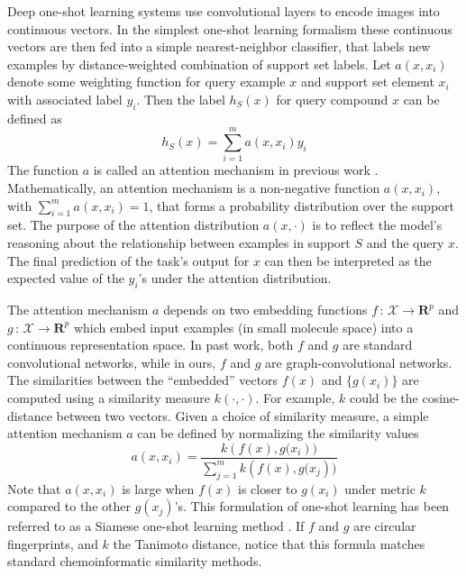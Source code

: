 \documentclass[journal=jacsat,manuscript=article]{achemso}
\begin{document}
Deep one-shot learning systems \cite{santoro2016one, vinyals2016matching} use convolutional layers to encode images into continuous vectors. In the simplest one-shot learning formalism these continuous vectors are then fed into a simple nearest-neighbor classifier, that labels new examples by distance-weighted combination of support set labels. Let $a(x, x_i)$ denote some weighting function for query example $x$ and support set element $x_i$ with associated label $y_i$. Then the label $h_S(x)$ for query compound $x$ can be defined as
\[
h_S(x) = \sum\limits_{i=1}^{m}a\left(x,x_i\right)y_i
\]
The function $a$ is called an attention mechanism in previous work \cite{vinyals2016matching}. Mathematically, an attention mechanism is a non-negative function $a(x,x_i)$, with $\sum\nolimits_{i=1}^{m}a(x,x_i)=1$, that forms a probability distribution over the support set. The purpose of the attention distribution $a(x, \cdot)$ is to reflect the model's reasoning about the relationship between examples in support $S$ and the query $x$. The final prediction of the task's output for $x$ can then be interpreted as the expected value of the $y_i$'s under the attention distribution.

The attention mechanism $a$ depends on two embedding functions $f\,:\,\mathcal{X}\rightarrow\mathbf{R}^p$ and $g\,:\,\mathcal{X}\rightarrow\mathbf{R}^p$ which embed input examples (in small molecule space) into a continuous representation space. In past work, both $f$ and $g$ are standard convolutional networks, while in ours, $f$ and $g$ are graph-convolutional networks. The similarities between the ``embedded'' vectors $f(x)$ and $\{g(x_i)\}$ are computed using a similarity measure $k(\cdot,\cdot)$.  For example, $k$ could be the cosine-distance between two vectors. Given a choice of similarity measure, a simple attention mechanism $a$ can be defined by normalizing the similarity values
\[
a(x,x_i) = \frac{k\left(f(x),g(x_i\right))}{\sum\nolimits_{j=1}^{m} k\left(f(x),g(x_j\right))}
\]
Note that $a(x,x_i)$ is large when $f(x)$ is closer to $g(x_i)$ under metric $k$ compared to the other $g(x_j)$'s. This formulation of one-shot learning has been referred to as a Siamese one-shot learning method \cite{koch2015siamese}. If $f$ and $g$ are circular fingerprints\cite{rogers2010extended}, and $k$ the Tanimoto distance, notice that this formula matches standard chemoinformatic similarity methods.

\end{document}
